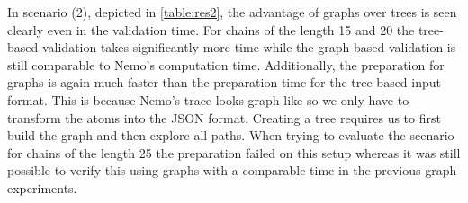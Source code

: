 \begin{table}
\centering
\caption{Results for scenario 2}
\label{table:res2}
\end{table}

In scenario (2), depicted in \cref{table:res2}, the advantage of graphs over trees is seen clearly even in the validation time. For chains of the length 15 and 20 the tree-based validation takes significantly more time while the graph-based validation is still comparable to Nemo's computation time. Additionally, the preparation for graphs is again much faster than the preparation time for the tree-based input format. This is because Nemo's trace looks graph-like so we only have to transform the atoms into the JSON format. Creating a tree requires us to first build the graph and then explore all paths. When trying to evaluate the scenario for chains of the length 25 the preparation failed on this setup whereas it was still possible to verify this using graphs with a comparable time in the previous graph experiments.

